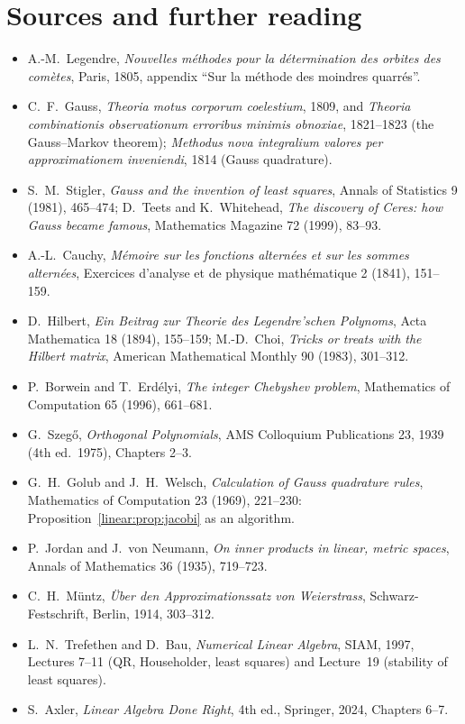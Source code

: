 \section*{Sources and further reading}

\begin{itemize}
\item A.-M.~Legendre, \emph{Nouvelles m\'ethodes pour la d\'etermination des orbites des com\`etes}, Paris, 1805, appendix
``Sur la m\'ethode des moindres quarr\'es''.
\item C.~F.~Gauss, \emph{Theoria motus corporum coelestium}, 1809, and \emph{Theoria combinationis observationum erroribus
minimis obnoxiae}, 1821--1823 (the Gauss--Markov theorem); \emph{Methodus nova integralium valores per approximationem
inveniendi}, 1814 (Gauss quadrature).
\item S.~M.~Stigler, \emph{Gauss and the invention of least squares}, Annals of Statistics 9 (1981), 465--474; D.~Teets and
K.~Whitehead, \emph{The discovery of Ceres: how Gauss became famous}, Mathematics Magazine 72 (1999), 83--93.
\item A.-L.~Cauchy, \emph{M\'emoire sur les fonctions altern\'ees et sur les sommes altern\'ees}, Exercices d'analyse et de
physique math\'ematique 2 (1841), 151--159.
\item D.~Hilbert, \emph{Ein Beitrag zur Theorie des Legendre'schen Polynoms}, Acta Mathematica 18 (1894), 155--159;
M.-D.~Choi, \emph{Tricks or treats with the Hilbert matrix}, American Mathematical Monthly 90 (1983), 301--312.
\item P.~Borwein and T.~Erd\'elyi, \emph{The integer Chebyshev problem}, Mathematics of Computation 65 (1996), 661--681.
\item G.~Szeg\H{o}, \emph{Orthogonal Polynomials}, AMS Colloquium Publications 23, 1939 (4th ed.\ 1975), Chapters 2--3.
\item G.~H.~Golub and J.~H.~Welsch, \emph{Calculation of Gauss quadrature rules}, Mathematics of Computation 23 (1969),
221--230: Proposition~\ref{linear:prop:jacobi} as an algorithm.
\item P.~Jordan and J.~von Neumann, \emph{On inner products in linear, metric spaces}, Annals of Mathematics 36 (1935),
719--723.
\item C.~H.~M\"untz, \emph{\"Uber den Approximationssatz von Weierstrass}, Schwarz-Festschrift, Berlin, 1914, 303--312.
\item L.~N.~Trefethen and D.~Bau, \emph{Numerical Linear Algebra}, SIAM, 1997, Lectures 7--11 (QR, Householder, least
squares) and Lecture~19 (stability of least squares).
\item S.~Axler, \emph{Linear Algebra Done Right}, 4th ed., Springer, 2024, Chapters 6--7.
\end{itemize}
